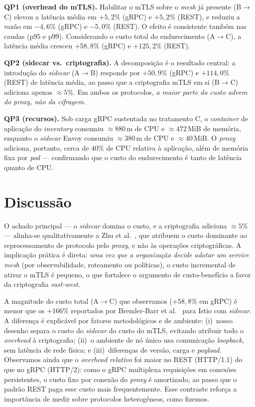 \documentclass[12pt]{article}
\begin{document}
\noindent\textbf{QP1 (overhead do mTLS).} Habilitar o mTLS sobre o \textit{mesh} j\'a presente (B$\rightarrow$C) elevou a lat\^encia m\'edia em $+5{,}2\%$ (gRPC) e $+5{,}2\%$ (REST), e reduziu a vaz\~ao em $-4{,}6\%$ (gRPC) e $-5{,}0\%$ (REST). O efeito \'e consistente tamb\'em nas caudas (p95 e p99). Considerando o custo total do endurecimento (A$\rightarrow$C), a lat\^encia m\'edia cresceu $+58{,}8\%$ (gRPC) e $+125{,}2\%$ (REST).

\noindent\textbf{QP2 (sidecar vs.\ criptografia).} A decomposi\c{c}\~ao \'e o resultado central: a introdu\c{c}\~ao do \textit{sidecar} (A$\rightarrow$B) responde por $+50{,}9\%$ (gRPC) e $+114{,}0\%$ (REST) de lat\^encia m\'edia, ao passo que a criptografia mTLS em si (B$\rightarrow$C) adiciona apenas $\approx 5\%$. Em ambos os protocolos, \emph{a maior parte do custo advem do \textit{proxy}, n\~ao da cifragem}.

\noindent\textbf{QP3 (recursos).} Sob carga gRPC sustentada no tratamento C, o \textit{container} de aplica\c{c}\~ao do \textit{inventory} consumiu $\approx 880$\,m de CPU e $\approx 472$\,MiB de mem\'oria, enquanto o \textit{sidecar} Envoy consumiu $\approx 380$\,m de CPU e $\approx 40$\,MiB. O \textit{proxy} adiciona, portanto, cerca de $40\%$ de CPU relativa \`a aplica\c{c}\~ao, al\'em de mem\'oria fixa por \textit{pod} --- confirmando que o custo do endurecimento \'e tanto de lat\^encia quanto de CPU.

\section{Discuss\~ao}

O achado principal --- o \textit{sidecar} domina o custo, e a criptografia adiciona $\approx 5\%$ --- alinha-se qualitativamente a Zhu et al.\ \cite{zhu2023}, que atribuem o custo dominante ao reprocessamento de protocolo pelo \textit{proxy}, e n\~ao \`as opera\c{c}\~oes criptogr\'aficas. A implica\c{c}\~ao pr\'atica \'e direta: \emph{uma vez que a organiza\c{c}\~ao decide adotar um \textit{service mesh}} (por observabilidade, roteamento ou pol\'iticas), o custo incremental de ativar o mTLS \'e pequeno, o que fortalece o argumento de custo-benef\'icio a favor da criptografia \textit{east-west}.

A magnitude do custo total (A$\rightarrow$C) que observamos ($+58{,}8\%$ em gRPC) \'e menor que os $+166\%$ reportados por Bremler-Barr et al.\ \cite{bremlerbarr2024} para Istio com \textit{sidecar}. A diferen\c{c}a \'e explic\'avel por fatores metodol\'ogicos e de ambiente: (i)~nosso desenho separa o custo do \textit{sidecar} do custo do mTLS, evitando atribuir todo o \textit{overhead} \`a criptografia; (ii)~o ambiente de n\'o \'unico usa comunica\c{c}\~ao \textit{loopback}, sem lat\^encia de rede f\'isica; e (iii)~diferen\c{c}as de vers\~ao, carga e \textit{payload}. Observamos ainda que o \textit{overhead} \emph{relativo} foi maior no REST (HTTP/1.1) do que no gRPC (HTTP/2): como o gRPC multiplexa requisi\c{c}\~oes em conex\~oes persistentes, o custo fixo por conex\~ao do \textit{proxy} \'e amortizado, ao passo que o padr\~ao REST paga esse custo mais frequentemente. Esse contraste refor\c{c}a a import\^ancia de medir sobre protocolos heterog\^eneos, como fizemos.
\end{document}
